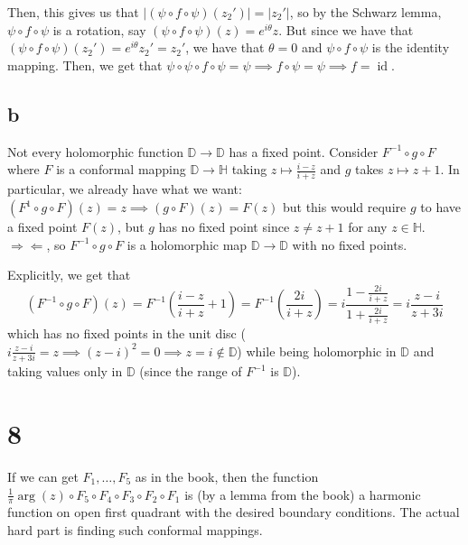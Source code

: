 \documentclass[12pt,letterpaper]{article}
\theoremstyle{definition}
\newcommand{\contra}{\Rightarrow\!\Leftarrow}
\newcommand{\D}{\mathbb{D}}
\newcommand{\Ha}{\mathbb{H}}
\DeclareMathOperator{\id}{id}
\begin{document}
Then, this gives us that $|(\psi \circ f \circ \psi)(z_{2}')| = |z_{2}'|$, so by the Schwarz lemma, $\psi \circ f \circ \psi$ is a rotation, say $(\psi \circ f \circ \psi)(z) = e^{i\theta}z$. But since we have that $(\psi \circ f \circ \psi)(z_{2}') = e^{i\theta}z_{2}' = z_{2}'$, we have that $\theta = 0$ and $\psi \circ f \circ \psi$ is the identity mapping. Then, we get that $\psi \circ \psi \circ f \circ \psi = \psi \implies f \circ \psi = \psi \implies f = \id$.

\subsection*{b}

Not every holomorphic function $\D \rightarrow \D$ has a fixed point. Consider $F^{-1} \circ g \circ F$ where $F$ is a conformal mapping $\D \rightarrow \Ha$ taking $z \mapsto \frac{i - z}{i + z}$ and $g$ takes $z \mapsto z + 1$. In particular, we already have what we want: $(F^{1} \circ g \circ F)(z) = z \implies (g \circ F)(z) = F(z)$ but this would require $g$ to have a fixed point $F(z)$, but $g$ has no fixed point since $z \neq z + 1$ for any $z \in \Ha$. $\contra$, so $F^{-1} \circ g \circ F$ is a holomorphic map $\D \rightarrow \D$ with no fixed points.

Explicitly, we get that
\[
  (F^{-1} \circ g \circ F)(z) = F^{-1}\left(\frac{i - z}{i + z} + 1\right) = F^{-1}\left(\frac{2i}{i + z}\right) = i\frac{1 - \frac{2i}{i + z}}{1 + \frac{2i}{i + z}} = i\frac{z - i}{z + 3i}
\]
which has no fixed points in the unit disc ($i\frac{z - i}{z + 3i} = z \implies (z - i)^{2} = 0 \implies z = i \notin \D$) while being holomorphic in $\D$ and taking values only in $\D$ (since the range of $F^{-1}$ is $\D$).

\section*{8}

If we can get $F_{1}, \dots, F_{5}$ as in the book, then the function $\frac{1}{\pi}\arg(z) \circ F_{5} \circ F_{4} \circ F_{3} \circ F_{2} \circ F_{1}$ is (by a lemma from the book) a harmonic function on open first quadrant with the desired boundary conditions. The actual hard part is finding such conformal mappings.
\end{document}
